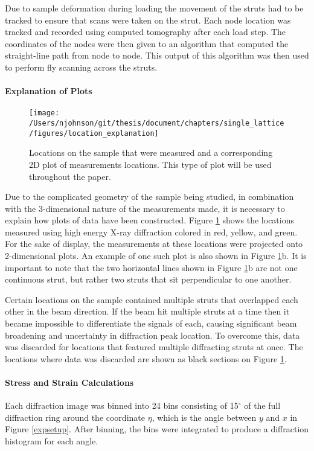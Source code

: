 Due to sample deformation during loading the movement of the struts had to be tracked to ensure that scans were taken on the strut. Each node location was tracked and recorded using computed tomography after each load step. The coordinates of the nodes were then given to an algorithm that computed the straight-line path from node to node. This output of this algorithm was then used to perform fly scanning across the struts.

\paragraph{Explanation of Plots}
\begin{figure}
	\texttt{[image: /Users/njohnson/git/thesis/document/chapters/single\_lattice/figures/location\_explanation]}
	\caption{Locations on the sample that were measured and a corresponding 2D plot of measurements locations. This type of plot will be used throughout the paper.}
	\label{location_explanation}
\end{figure}
Due to the complicated geometry of the sample being studied, in combination with the 3-dimensional nature of the measurements made, it is necessary to explain how plots of data have been constructed. Figure \ref{location_explanation} shows the locations measured using high energy X-ray diffraction colored in red, yellow, and green. For the sake of display, the measurements at these locations were projected onto 2-dimensional plots. An example of one such plot is also shown in Figure \ref{location_explanation}b. It is important to note that the two horizontal lines shown in Figure \ref{location_explanation}b are not one continuous strut, but rather two struts that sit perpendicular to one another.

Certain locations on the sample contained multiple struts that overlapped each other in the beam direction. If the beam hit multiple struts at a time then it became impossible to differentiate the signals of each, causing significant beam broadening and uncertainty in diffraction peak location. To overcome this, data was discarded for locations that featured multiple diffracting struts at once. The locations where data was discarded are shown as black sections on Figure \ref{location_explanation}.

\paragraph{Stress and Strain Calculations}
Each diffraction image was binned into 24 bins consisting of 15$^\circ$ of the full diffraction ring around the coordinate $\eta$, which is the angle between $y$ and $x$ in Figure \ref{expsetup}. After binning, the bins were integrated to produce a diffraction histogram for each angle.

